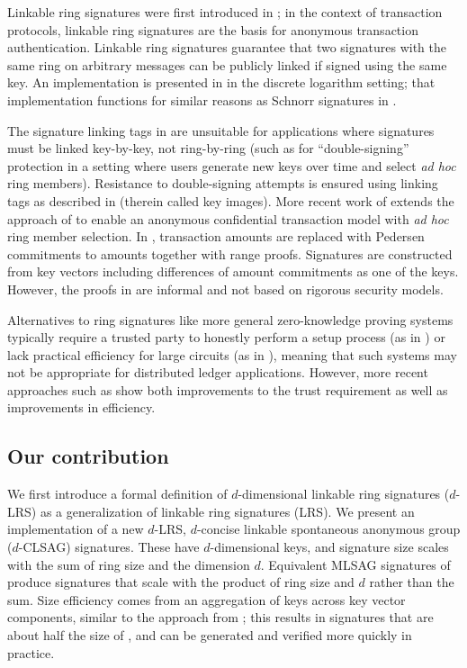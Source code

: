 \documentclass[draft]{llncs} %
\begin{document}
Linkable ring signatures were first introduced in \cite{liu}; in the context of transaction protocols, linkable ring signatures are the basis for anonymous transaction authentication. Linkable ring signatures guarantee that two signatures with the same ring on arbitrary messages can be publicly linked if signed using the same key. An implementation is presented in \cite{liu} in the discrete logarithm setting; that implementation functions for similar reasons as Schnorr signatures in \cite{schnorr1991efficient}.

The signature linking tags in \cite{liu} are unsuitable for applications where signatures must be linked key-by-key, not ring-by-ring (such as for ``double-signing'' protection in a setting where users generate new keys over time and select \textit{ad hoc} ring members). Resistance to double-signing attempts is ensured using linking tags as described in \cite{van2013cryptonote} (therein called key images). More recent work of \cite{noether} extends the approach of \cite{liu} to enable an anonymous confidential transaction model with \textit{ad hoc} ring member selection. In \cite{noether}, transaction amounts are replaced with Pedersen commitments to amounts together with range proofs. Signatures are constructed from key vectors including differences of amount commitments as one of the keys. However, the proofs in \cite{noether} are informal and not based on rigorous security models.

Alternatives to ring signatures like more general zero-knowledge proving systems typically require a trusted party to honestly perform a setup process (as in \cite{groth,ben2014succinct,groth2018updatable}) or lack practical efficiency for large circuits (as in \cite{bulletproofs}), meaning that such systems may not be appropriate for distributed ledger applications. However, more recent approaches such as \cite{bowehalo,hoffmann2019efficient} show both improvements to the trust requirement as well as improvements in efficiency.


\subsection{Our contribution}

We first introduce a formal definition of $d$-dimensional linkable ring signatures ($d$-LRS) as a generalization of linkable ring signatures (LRS). We present an implementation of a new $d$-LRS, $d$-concise linkable spontaneous anonymous group ($d$-CLSAG) signatures. These have $d$-dimensional keys, and signature size scales with the sum of ring size and the dimension $d$. Equivalent MLSAG signatures of \cite{noether} produce signatures that scale with the product of ring size and $d$ rather than the sum. Size efficiency comes from an aggregation of keys across key vector components, similar to the approach from \cite{maxwell2018simple,qian2010non}; this results in signatures that are about half the size of \cite{noether}, and can be generated and verified more quickly in practice.
\end{document}
